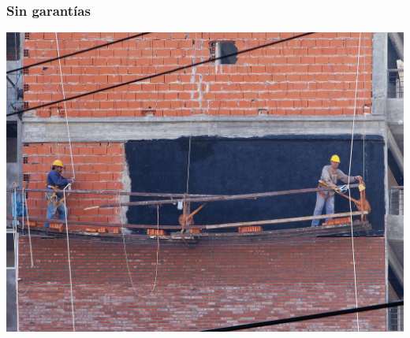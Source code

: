 \documentclass[8pt,xcolor={usenames,dvipsnames}]{beamer}
\begin{document}
\begin{frame}
\frametitle{Sin garantías}
\includegraphics[height=\paperheight]{images/nowarranty.jpg}
\end{frame}
\end{document}
